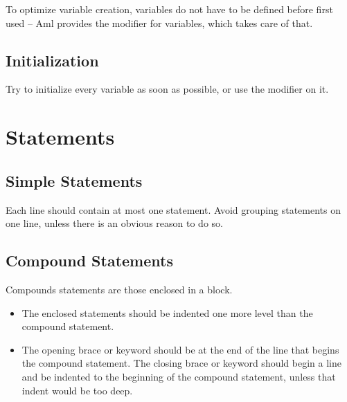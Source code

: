 To optimize variable creation, variables do not have to be defined before first used -- Aml provides the  modifier for variables, which takes care of that. 





\subsection{Initialization}

Try to initialize every variable as soon as possible, or use the  modifier on it. 





\section{Statements}






\subsection{Simple Statements}

Each line should contain at most one statement. Avoid grouping statements on one line, unless there is an obvious reason to do so. 





\subsection{Compound Statements}

Compounds statements are those enclosed in a block. 
\begin{itemize}
  \item The enclosed statements should be indented one more level than the compound statement. 
  \item The opening brace or keyword should be at the end of the line that begins the compound statement. The closing brace or keyword should begin a line and be indented to the beginning of the compound statement, unless that indent would be too deep. 
\end{itemize}













